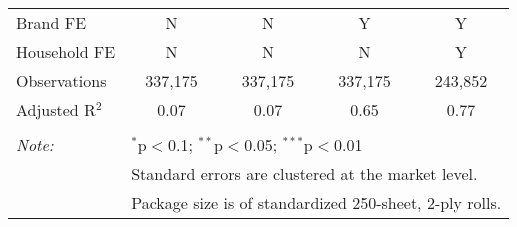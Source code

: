 \begin{table}[!htbp]
\begin{tabular}{@{\extracolsep{5pt}}lcccc}
Brand FE & N & N & Y & Y \\ 
Household FE & N & N & N & Y \\ 
Observations & 337,175 & 337,175 & 337,175 & 243,852 \\ 
Adjusted R$^{2}$ & 0.07 & 0.07 & 0.65 & 0.77 \\ 
\hline 
\hline \\[-1.8ex] 
\textit{Note:}  & \multicolumn{4}{l}{$^{*}$p$<$0.1; $^{**}$p$<$0.05; $^{***}$p$<$0.01} \\ 
 & \multicolumn{4}{l}{Standard errors are clustered at the market level.} \\ 
 & \multicolumn{4}{l}{Package size is of standardized 250-sheet, 2-ply rolls.} \\ 
\end{tabular} 
\end{table} 
